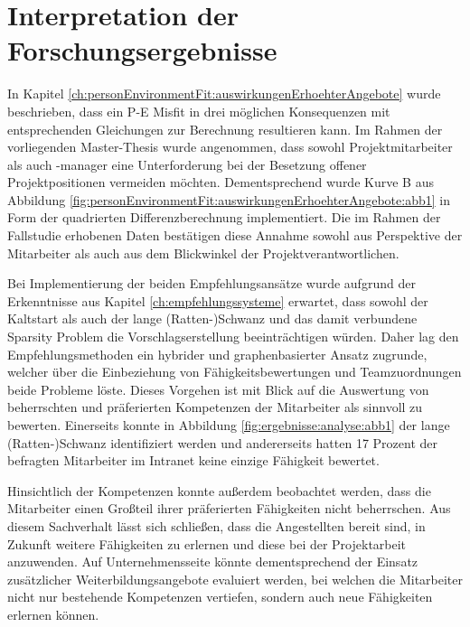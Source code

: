 \section{Interpretation der Forschungsergebnisse}
\label{ch:diskussion:interpretation}
In Kapitel \ref{ch:personEnvironmentFit:auswirkungenErhoehterAngebote} wurde beschrieben, dass ein P-E Misfit in drei möglichen Konsequenzen mit entsprechenden Gleichungen zur Berechnung resultieren kann. Im Rahmen der vorliegenden Master-Thesis wurde angenommen, dass sowohl Projektmitarbeiter als auch -manager eine Unterforderung bei der Besetzung offener Projektpositionen vermeiden möchten. Dementsprechend wurde Kurve B aus Abbildung \ref{fig:personEnvironmentFit:auswirkungenErhoehterAngebote:abb1} in Form der quadrierten Differenzberechnung implementiert. Die im Rahmen der Fallstudie erhobenen Daten bestätigen diese Annahme sowohl aus Perspektive der Mitarbeiter als auch aus dem Blickwinkel der Projektverantwortlichen. 

Bei Implementierung der beiden Empfehlungsansätze wurde aufgrund der Erkenntnisse aus Kapitel \ref{ch:empfehlungssysteme} erwartet, dass sowohl der Kaltstart als auch der lange (Ratten-)Schwanz und das damit verbundene Sparsity Problem die Vorschlagserstellung beeinträchtigen würden. Daher lag den Empfehlungsmethoden ein hybrider und graphenbasierter Ansatz zugrunde, welcher über die Einbeziehung von Fähigkeitsbewertungen und Teamzuordnungen beide Probleme löste. Dieses Vorgehen ist mit Blick auf die Auswertung von beherrschten und präferierten Kompetenzen der Mitarbeiter als sinnvoll zu bewerten. Einerseits konnte in Abbildung \ref{fig:ergebnisse:analyse:abb1} der lange (Ratten-)Schwanz identifiziert werden und andererseits hatten 17 Prozent der befragten Mitarbeiter im Intranet keine einzige Fähigkeit bewertet.%

Hinsichtlich der Kompetenzen konnte außerdem beobachtet werden, dass die Mitarbeiter einen Großteil ihrer präferierten Fähigkeiten nicht beherrschen. Aus diesem Sachverhalt lässt sich schließen, dass die Angestellten bereit sind, in Zukunft weitere Fähigkeiten zu erlernen und diese bei der Projektarbeit anzuwenden. Auf Unternehmensseite könnte dementsprechend der Einsatz zusätzlicher Weiterbildungsangebote evaluiert werden, bei welchen die Mitarbeiter nicht nur bestehende Kompetenzen vertiefen, sondern auch neue Fähigkeiten erlernen können.

